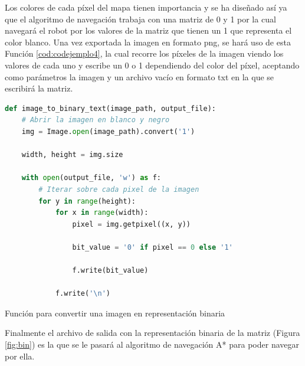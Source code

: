 Los colores de cada píxel del mapa tienen importancia y se ha diseñado así ya que el algoritmo de navegación trabaja con una matriz de 0 y 1 por la cual navegará el robot por los valores de la matriz que tienen un 1 que representa el color blanco. Una vez exportada la imagen en formato png, se hará uso de esta Función \ref{cod:codejemplo4}, la cual recorre los píxeles de la imagen viendo los valores de cada uno y escribe un 0 o 1 dependiendo del color del píxel, aceptando como parámetros la imagen y un archivo vacío en formato txt en la que se escribirá la matriz.

\begin{code}[H]
\begin{lstlisting}[language=Python]
def image_to_binary_text(image_path, output_file):
    # Abrir la imagen en blanco y negro
    img = Image.open(image_path).convert('1') 

    width, height = img.size
   
    with open(output_file, 'w') as f:
        # Iterar sobre cada pixel de la imagen
        for y in range(height):
            for x in range(width):
                pixel = img.getpixel((x, y))

                bit_value = '0' if pixel == 0 else '1'

                f.write(bit_value)

            f.write('\n') 
\end{lstlisting}
\caption[Función para convertir una imagen en representación binaria ]{Función para convertir una imagen en representación binaria}
\label{cod:codejemplo4}
\end{code}

Finalmente el archivo de salida con la representación binaria de la matriz (Figura \ref{fig:bin}) es la que se le pasará al algoritmo de navegación A* para poder navegar por ella. 

